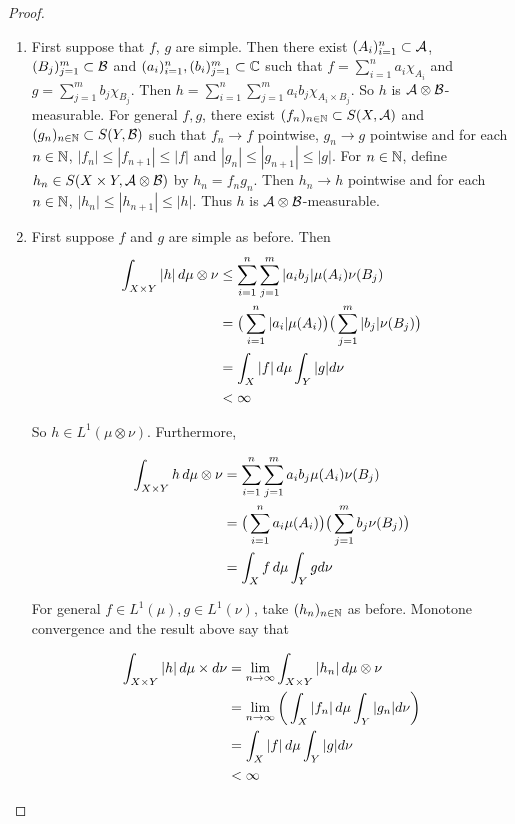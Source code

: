 \documentclass{book}
\begin{document}
	\begin{proof}\
		\begin{enumerate}
			\item First suppose that $f$, $g$ are simple. Then there exist $(A_i)_{i=1}^n \subset \mathcal{A}$, $(B_j)_{j=1}^m \subset \mathcal{B}$ and $(a_i)_{i=1}^n, (b_i)_{j=1}^m \subset \mathbb{C}$ such that $f = \sum\limits_{i=1}^n a_i \chi_{A_i}$ and $g = \sum\limits_{j=1}^m b_j \chi_{B_j}$. Then $h = \sum\limits_{i=1}^n \sum\limits_{j=1}^m a_i b_j \chi_{A_i \times B_j}$. So $h$ is $\mathcal{A} \otimes \mathcal{B}$-measurable. For general $f,g$, there exist $(f_n)_{n \in \mathbb{N}} \subset S(X, \mathcal{A})$ and $(g_n)_{n \in \mathbb{N}} \subset S(Y, \mathcal{B})$ such that $f_n \rightarrow f$ pointwise, $g_n \rightarrow g$ pointwise and for each $n \in \mathbb{N}$, $|f_n| \leq |f_{n+1}| \leq |f|$ and $|g_n| \leq |g_{n+1}| \leq |g|$. For $n \in \mathbb{N}$, define $h_n \in S(X \times Y, \mathcal{A} \otimes \mathcal{B})$ by $h_n = f_n g_n$. Then $h_n \rightarrow h$ pointwise and for each $n \in \mathbb{N}$, $|h_n| \leq |h_{n+1}| \leq |h|$. Thus $h$ is $\mathcal{A} \otimes \mathcal{B}$-measurable.
			
			\item First suppose $f$ and $g$ are simple as before. Then  
			\begin{align*}
				\int_{X \times Y} |h| \, d \mu \otimes \nu 
				& \leq \sum\limits_{i=1}^n \sum\limits_{j=1}^m |a_i b_j| \mu(A_i) \nu(B_j)\\ 
				&= \big(\sum\limits_{i=1}^n |a_i| \mu(A_i) \big) \big( \sum\limits_{j=1}^m |b_j| \nu(B_j) \big)\\
				&= \int_X |f| \, d \mu \int_Y |g| d \nu\\
				&< \infty
			\end{align*}
			
			So $h \in L^1(\mu \otimes \nu)$. Furthermore, 
			
			\begin{align*}
				\int_{X \times Y} h \, d \mu \otimes \nu 
				&= \sum\limits_{i=1}^n \sum\limits_{j=1}^m a_i b_j \mu(A_i) \nu(B_j)\\ 
				&= \big(\sum\limits_{i=1}^n a_i \mu(A_i) \big) \big( \sum\limits_{j=1}^m b_j \nu(B_j) \big)\\
				&= \int_X f \, d \mu \int_Y gd \nu
			\end{align*}
			
			For general $f \in L^1(\mu), g \in L^1(\nu)$, take $(h_n)_{n \in \mathbb{N}}$ as before. Monotone convergence and the result above say that 
			
			\begin{align*}
				\int_{X \times Y} |h| \, d \mu \times d\nu 
				&= \lim \limits_{n \rightarrow \infty} \int_{X \times Y} |h_n|\, d \mu \otimes \nu\\
				&=  \lim \limits_{n \rightarrow \infty} \bigg( \int_X |f_n| \, d \mu \int_Y |g_n| d\nu \bigg) \\
				&= \int_X |f| \, d \mu \int_Y |g| d\nu\\
				& < \infty
			\end{align*}
			

\end{enumerate}
\end{proof}
\end{document}
